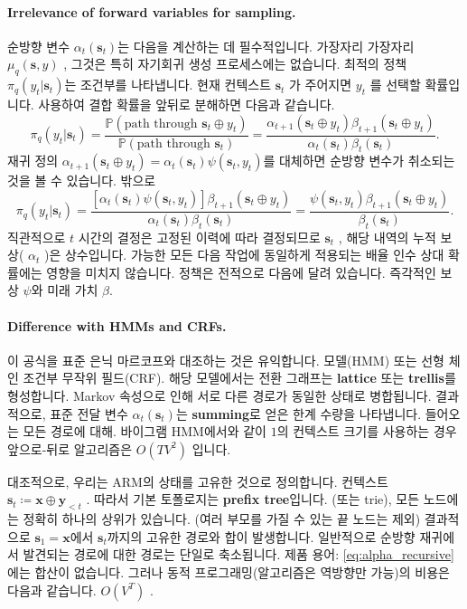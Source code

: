 \documentclass{article}
\def\s{{\bm{s}}}
\def\x{{\bm{x}}}
\def\y{{\bm{y}}}
\def\PP{{\mathbb{P}}}
\begin{document}
\paragraph{Irrelevance of forward variables for sampling.}

순방향 변수 $\alpha_t(\s_t)$는 다음을 계산하는 데 필수적입니다.
가장자리 가장자리 $\mu_q(\s, y)$ , 그것은
특히 자기회귀 생성 프로세스에는 없습니다.
최적의 정책 $\pi_q(y_t | \s_t)$는 조건부를 나타냅니다.
현재 컨텍스트 $\s_t$ 가 주어지면 $y_t$ 를 선택할 확률입니다. 사용하여
결합 확률을 앞뒤로 분해하면 다음과 같습니다.
 \begin{equation} 
 \pi _q(y_t | \s _t) = \frac { \PP ( \text{path through } \s _t \oplus 
y_t)}{ \PP ( \text{path through } \s _t)} = \frac { \alpha _{t+1}( \s _t \oplus y_t)
 \beta _{t+1}( \s _t \oplus y_t)}{ \alpha _t( \s _t) \beta _t( \s _t)}.
 \end{equation} 
재귀 정의 $\alpha_{t+1}(\s_t \oplus y_t) =
\alpha_t(\s_t) \psi(\s_t, y_t)$를 대체하면 순방향 변수가 취소되는 것을 볼 수 있습니다.
밖으로
 \begin{equation} 
 \pi _q(y_t | \s _t) = \frac {[ \alpha _t( \s _t) \psi ( \s _t, y_t)] \beta _{t+1}( \s _t
 \oplus y_t)}{ \alpha _t( \s _t) \beta _t( \s _t)} = \frac { \psi ( \s _t, y_t)
 \beta _{t+1}( \s _t \oplus y_t)}{ \beta _t( \s _t)}.
 \end{equation} 
직관적으로 $t$ 시간의 결정은 고정된 이력에 따라 결정되므로
 $\s_t$ , 해당 내역의 누적 보상( $\alpha_t$ )은 상수입니다.
가능한 모든 다음 작업에 동일하게 적용되는 배율 인수
상대 확률에는 영향을 미치지 않습니다. 정책은 전적으로 다음에 달려 있습니다.
즉각적인 보상 $\psi$와 미래 가치 $\beta$.

\paragraph{Difference with HMMs and CRFs.}

이 공식을 표준 은닉 마르코프와 대조하는 것은 유익합니다.
모델(HMM) 또는 선형 체인 조건부 무작위 필드(CRF). 해당 모델에서는
전환 그래프는 \textbf{lattice} 또는 \textbf{trellis}를 형성합니다.
Markov 속성으로 인해 서로 다른 경로가 동일한 상태로 병합됩니다. 
결과적으로, 표준 전달 변수
 $\alpha_t(\s_t)$는 \textbf{summing}로 얻은 한계 수량을 나타냅니다. 
들어오는 모든 경로에 대해. 
바이그램 HMM에서와 같이 $1$의 컨텍스트 크기를 사용하는 경우
앞으로-뒤로 알고리즘은 $O(T V^2)$ 입니다.

대조적으로, 우리는 ARM의 상태를 고유한 것으로 정의합니다.
컨텍스트 $\s_t \coloneqq \x \oplus \y_{<t}$ .
따라서 기본 토폴로지는 \textbf{prefix tree}입니다. 
(또는 trie), 모든 노드에는 정확히 하나의 상위가 있습니다. 
(여러 부모를 가질 수 있는 끝 노드는 제외) 
결과적으로 $\s_1 = \x$에서 $\s_t$까지의 고유한 경로와 합이 발생합니다.
일반적으로 순방향 재귀에서 발견되는 경로에 대한 경로는 단일로 축소됩니다.
제품 용어: \eqref{eq:alpha_recursive}에는 합산이 없습니다.
그러나 동적 프로그래밍(알고리즘은 역방향만 가능)의 비용은 다음과 같습니다.
 $O(V^T)$ .
\end{document}
